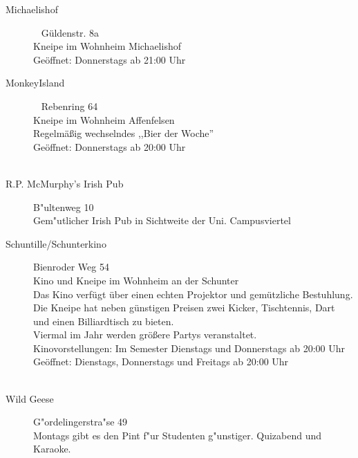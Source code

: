 \begin{description}
\item[Michaelishof]~ \hfill Güldenstr. 8a\\
  Kneipe im Wohnheim Michaelishof\\
  Geöffnet: Donnerstags ab 21:00 Uhr\\
\item[MonkeyIsland]~ \hfill Rebenring 64\\
  Kneipe im Wohnheim Affenfelsen\\
  Regelmäßig wechselndes ,,Bier der Woche''\\
  Geöffnet: Donnerstags ab 20:00 Uhr\\
  \\
\item[R.P. McMurphy's Irish Pub] \hfill B"ultenweg 10\\
Gem"utlicher Irish Pub in Sichtweite der Uni.
Campusviertel
 \item[Schuntille/Schunterkino] \small{Bienroder Weg 54}\\
   \normalsize
   Kino und Kneipe im Wohnheim an der Schunter\\
   Das Kino verfügt über einen echten Projektor und gemützliche
   Bestuhlung.\\
 Die Kneipe hat neben    günstigen Preisen zwei Kicker, Tischtennis, Dart und einen
   Billiardtisch zu bieten.\\
   Viermal im Jahr werden größere Partys veranstaltet.\\
   Kinovorstellungen: Im Semester Dienstags und Donnerstags ab 20:00 Uhr\\
   Geöffnet: Dienstags, Donnerstags und Freitags ab 20:00 Uhr
   \\\\
   \item[Wild Geese] \hfill G"ordelingerstra"se 49\\
Montags gibt es den Pint f"ur Studenten g"unstiger.
Quizabend und Karaoke.\\

\end{description}
